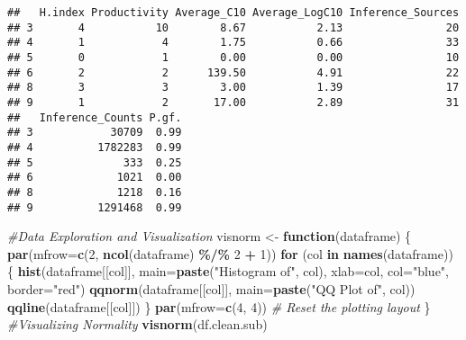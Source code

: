 \documentclass[
]{article}
\newenvironment{Shaded}{\begin{snugshade}}{\end{snugshade}}
\newcommand{\AttributeTok}[1]{\textcolor[rgb]{0.13,0.29,0.53}{#1}}
\newcommand{\CommentTok}[1]{\textcolor[rgb]{0.56,0.35,0.01}{\textit{#1}}}
\newcommand{\ControlFlowTok}[1]{\textcolor[rgb]{0.13,0.29,0.53}{\textbf{#1}}}
\newcommand{\DecValTok}[1]{\textcolor[rgb]{0.00,0.00,0.81}{#1}}
\newcommand{\FunctionTok}[1]{\textcolor[rgb]{0.13,0.29,0.53}{\textbf{#1}}}
\newcommand{\NormalTok}[1]{#1}
\newcommand{\OtherTok}[1]{\textcolor[rgb]{0.56,0.35,0.01}{#1}}
\newcommand{\SpecialCharTok}[1]{\textcolor[rgb]{0.81,0.36,0.00}{\textbf{#1}}}
\newcommand{\StringTok}[1]{\textcolor[rgb]{0.31,0.60,0.02}{#1}}
\begin{document}
\begin{Shaded}
\end{Shaded}

\begin{verbatim}
##   H.index Productivity Average_C10 Average_LogC10 Inference_Sources
## 3       4           10        8.67           2.13                20
## 4       1            4        1.75           0.66                33
## 5       0            1        0.00           0.00                10
## 6       2            2      139.50           4.91                22
## 8       3            3        3.00           1.39                17
## 9       1            2       17.00           2.89                31
##   Inference_Counts P.gf.
## 3            30709  0.99
## 4          1782283  0.99
## 5              333  0.25
## 6             1021  0.00
## 8             1218  0.16
## 9          1291468  0.99
\end{verbatim}

\begin{Shaded}
\begin{Highlighting}[]
\CommentTok{\#Data Exploration and Visualization}
\NormalTok{visnorm }\OtherTok{\textless{}{-}} \ControlFlowTok{function}\NormalTok{(dataframe) \{}
  \FunctionTok{par}\NormalTok{(}\AttributeTok{mfrow=}\FunctionTok{c}\NormalTok{(}\DecValTok{2}\NormalTok{, }\FunctionTok{ncol}\NormalTok{(dataframe) }\SpecialCharTok{\%/\%} \DecValTok{2} \SpecialCharTok{+} \DecValTok{1}\NormalTok{))}
  \ControlFlowTok{for}\NormalTok{ (col }\ControlFlowTok{in} \FunctionTok{names}\NormalTok{(dataframe)) \{}
    \FunctionTok{hist}\NormalTok{(dataframe[[col]], }\AttributeTok{main=}\FunctionTok{paste}\NormalTok{(}\StringTok{"Histogram of"}\NormalTok{, col), }\AttributeTok{xlab=}\NormalTok{col, }\AttributeTok{col=}\StringTok{"blue"}\NormalTok{, }\AttributeTok{border=}\StringTok{"red"}\NormalTok{)}
    \FunctionTok{qqnorm}\NormalTok{(dataframe[[col]], }\AttributeTok{main=}\FunctionTok{paste}\NormalTok{(}\StringTok{"QQ Plot of"}\NormalTok{, col))}
    \FunctionTok{qqline}\NormalTok{(dataframe[[col]])}
\NormalTok{  \}}
  \FunctionTok{par}\NormalTok{(}\AttributeTok{mfrow=}\FunctionTok{c}\NormalTok{(}\DecValTok{4}\NormalTok{, }\DecValTok{4}\NormalTok{)) }\CommentTok{\# Reset the plotting layout}
\NormalTok{\}}
\CommentTok{\#Visualizing Normality}
\FunctionTok{visnorm}\NormalTok{(df.clean.sub)}
\end{Highlighting}
\end{Shaded}
\end{document}
